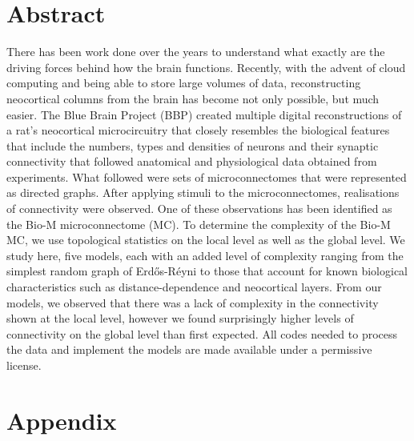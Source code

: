 \documentclass[svgnames]{article}
\newcommand{\ER}{Erd\H{o}s-R\'eyni }
\begin{document}
\section{Abstract}
There has been work done over the years to understand what exactly are the driving forces behind how the brain functions. Recently, with the advent of cloud computing and being able to store large volumes of data, reconstructing neocortical columns from the brain has become not only possible, but much easier. The Blue Brain Project (BBP) created multiple digital reconstructions of a rat's neocortical microcircuitry that closely resembles the biological features that include the numbers, types and densities of neurons and their synaptic connectivity that followed anatomical and physiological data obtained from experiments. What followed were sets of microconnectomes that were represented as directed graphs. After applying stimuli to the microconnectomes, realisations of connectivity were observed. One of these observations has been identified as the Bio-M microconnectome (MC). To determine the complexity of the Bio-M MC, we use topological statistics on the local level as well as the global level. We study here, five models, each with an added level of complexity ranging from the simplest random graph of \ER to those that account for known biological characteristics such as distance-dependence and neocortical layers. From our models, we observed that there was a lack of complexity in the connectivity shown at the local level, however we found surprisingly higher levels of connectivity on the global level than first expected. All codes needed to process the data and implement the models are made available \cite{Barber_Random_Graph_Models} under a permissive license.

\newpage

\newpage

\newpage
 
\newpage

\newpage

\newpage

\newpage






\newpage
\section{Appendix}



\end{document}
